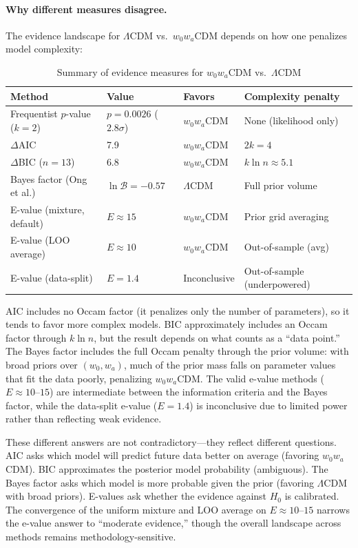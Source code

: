 \documentclass[11pt,a4paper]{article}
\newcommand{\LCDM}{$\Lambda$CDM}
\begin{document}
\paragraph{Why different measures disagree.} The evidence landscape for \LCDM{} vs.\ $w_0w_a$CDM depends on how one penalizes model complexity:

\begin{table}[H]
\centering
\caption{Summary of evidence measures for $w_0w_a$CDM vs.\ \LCDM}
\label{tab:evidence_summary}
\begin{tabular}{@{}llll@{}}
\toprule
\textbf{Method} & \textbf{Value} & \textbf{Favors} & \textbf{Complexity penalty} \\
\midrule
Frequentist $p$-value ($k=2$) & $p = 0.0026$ ($2.8\sigma$) & $w_0w_a$CDM & None (likelihood only) \\
$\Delta$AIC & 7.9 & $w_0w_a$CDM & $2k = 4$ \\
$\Delta$BIC ($n=13$) & 6.8 & $w_0w_a$CDM & $k\ln n \approx 5.1$ \\
Bayes factor (Ong et al.) & $\ln\mathcal{B} = -0.57$ & \LCDM & Full prior volume \\
E-value (mixture, default) & $E \approx 15$ & $w_0w_a$CDM & Prior grid averaging \\
E-value (LOO average) & $E \approx 10$ & $w_0w_a$CDM & Out-of-sample (avg) \\
E-value (data-split) & $E = 1.4$ & Inconclusive & Out-of-sample (underpowered) \\
\bottomrule
\end{tabular}
\end{table}

\noindent AIC includes no Occam factor (it penalizes only the number of parameters), so it tends to favor more complex models. BIC approximately includes an Occam factor through $k\ln n$, but the result depends on what counts as a ``data point.'' The Bayes factor includes the full Occam penalty through the prior volume: with broad priors over $(w_0, w_a)$, much of the prior mass falls on parameter values that fit the data poorly, penalizing $w_0w_a$CDM. The valid e-value methods ($E \approx 10$--$15$) are intermediate between the information criteria and the Bayes factor, while the data-split e-value ($E = 1.4$) is inconclusive due to limited power rather than reflecting weak evidence.

These different answers are not contradictory---they reflect different questions. AIC asks which model will predict future data better on average (favoring $w_0w_a$CDM). BIC approximates the posterior model probability (ambiguous). The Bayes factor asks which model is more probable given the prior (favoring \LCDM{} with broad priors). E-values ask whether the evidence against $H_0$ is calibrated. The convergence of the uniform mixture and LOO average on $E \approx 10$--$15$ narrows the e-value answer to ``moderate evidence,'' though the overall landscape across methods remains methodology-sensitive.
\end{document}
